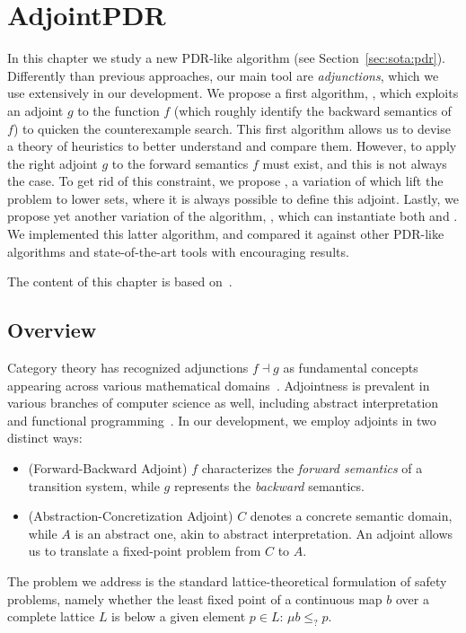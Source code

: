 
\chapter{AdjointPDR}\label{ch:pdr}
In this chapter we study a new PDR-like algorithm (see Section~\ref{sec:sota:pdr}). Differently than previous approaches, our main tool are \emph{adjunctions}, which we use extensively in our development. We propose a first algorithm, \APDR{}, which exploits an adjoint $g$ to the function $f$ (which roughly identify the backward semantics of $f$) to quicken the counterexample search. This first algorithm allows us to devise a theory of heuristics to better understand and compare them.
However, to apply \APDR{} the right adjoint $g$ to the forward semantics $f$ must exist, and this is not always the case. To get rid of this constraint, we propose \ADPDR{}, a variation of \APDR{} which lift the problem to lower sets, where it is always possible to define this adjoint.
Lastly, we propose yet another variation of the algorithm, \APDRAI{}, which can instantiate both \APDR{} and \ADPDR{}. We implemented this latter algorithm, and compared it against other PDR-like algorithms and state-of-the-art tools with encouraging results.

The content of this chapter is based on~\cite{KABBGH23}.

\section{Overview}
Category theory has recognized adjunctions $f \dashv g$ as fundamental concepts appearing across various mathematical domains~\cite{Lawvere69}. Adjointness is prevalent in various branches of computer science as well, including abstract interpretation and functional programming~\cite{Levy2004}. In our development, we employ adjoints in two distinct ways:
\begin{itemize}
	\item (Forward-Backward Adjoint) $f$ characterizes the \emph{forward semantics} of a transition system, while $g$ represents the \emph{backward} semantics.
	\item (Abstraction-Concretization Adjoint) $C$ denotes a concrete semantic domain, while $A$ is an abstract one, akin to abstract interpretation. An adjoint allows us to translate a fixed-point problem from $C$ to $A$.
\end{itemize}

The problem we address is the standard lattice-theoretical formulation of safety problems, namely whether the least fixed point of a continuous map $b$ over a complete lattice $L$ is below a given element $p \in L$: $\mu b\leq_{?} p$.

